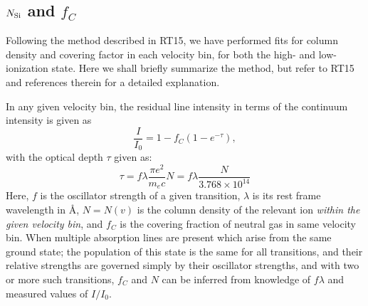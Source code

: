 \documentclass[twocolumn,]{aastex61}
\begin{document}


\subsection{$N_{\rm Si}$ and $f_C$}\label{sec:aod}

Following the method described in RT15, we have performed fits for
column density and covering factor in each velocity bin, for both the
high- and low-ionization state. Here we shall briefly summarize the
method, but refer to RT15 and references therein for a detailed
explanation.

In any given velocity bin, the residual line intensity in terms of the
continuum intensity is given as
%
\begin{equation}
\label{eq:II0}
\frac{I}{I_0} = 1 - f_C (1 - e^{-\tau}),
\end{equation}
%
 with the optical depth $\tau$ given as:
%
\begin{equation}
\label{eq:tau}
\tau = f\lambda \frac{\pi e^2}{m_e c} N 
       = f\lambda \frac{N}{3.768 \times 10^{14}}
\end{equation}
%
 Here, $f$ is the oscillator strength of a given transition, $\lambda$
is its rest frame wavelength in Å, $N = N(v)$ is the column density of
the relevant ion \emph{within the given velocity bin}, and $f_{C}$ is
the covering fraction of neutral gas in same velocity bin. When multiple
absorption lines are present which arise from the same ground state; the
population of this state is the same for all transitions, and their
relative strengths are governed simply by their oscillator strengths,
and with two or more such transitions, $f_{C}$ and $N$ can be inferred
from knowledge of $f \lambda$ and measured values of $I/I_0$.
\end{document}
